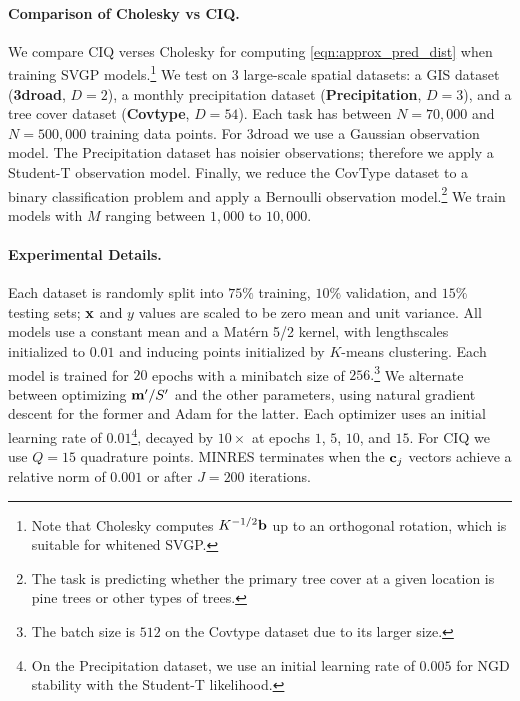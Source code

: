 \paragraph{Comparison of Cholesky vs CIQ.}
We compare CIQ verses Cholesky for computing \cref{eqn:approx_pred_dist} when training SVGP models.\footnote{
  Note that Cholesky computes $K^{-1/2} \mathbf{b}$ up to an orthogonal rotation, which is suitable for whitened SVGP.
}
We test on 3 large-scale spatial datasets: a GIS dataset ({\bf 3droad}, $D=2$), a monthly precipitation dataset ({\bf Precipitation}, $D=3$), and a tree cover dataset ({\bf Covtype}, $D=54$).
Each task has between $N=70,\!000$ and $N=500,\!000$ training data points.
For 3droad we use a Gaussian observation model.
The Precipitation dataset has noisier observations; therefore we apply a Student-T observation model.
Finally, we reduce the CovType dataset to a binary classification problem and apply a Bernoulli observation model.\footnote{
  The task is predicting whether the primary tree cover at a given location is pine trees or other types of trees.
}
We train models with $M$ ranging between $1,\!000$ to $10,\!000$.

\paragraph{Experimental Details.}
Each dataset is randomly split into $75\%$ training, $10\%$ validation, and $15\%$ testing sets; $\mathbf{x}$ and $y$ values are scaled to be zero mean and unit variance.
All models use a constant mean and a Mat\'ern 5/2 kernel, with lengthscales initialized to $0.01$ and inducing points initialized by $K$-means clustering.
Each model is trained for $20$ epochs with a minibatch size of $256.$\footnote{
  The batch size is $512$ on the Covtype dataset due to its larger size.
}
We alternate between optimizing $\mathbf{m}'/S'$ and the other parameters, using natural gradient descent for the former and Adam \cite{kingma2014adam} for the latter.
Each optimizer uses an initial learning rate of $0.01$\footnote{
  On the Precipitation dataset, we use an initial learning rate of $0.005$ for  NGD stability with the Student-T likelihood.
}, decayed by $10\times$ at epochs $1$, $5$, $10$, and $15$.
For CIQ we use $Q = 15$ quadrature points.
MINRES terminates when the $\mathbf{c}_j$ vectors achieve a relative norm of $0.001$ or after $J=200$ iterations.


